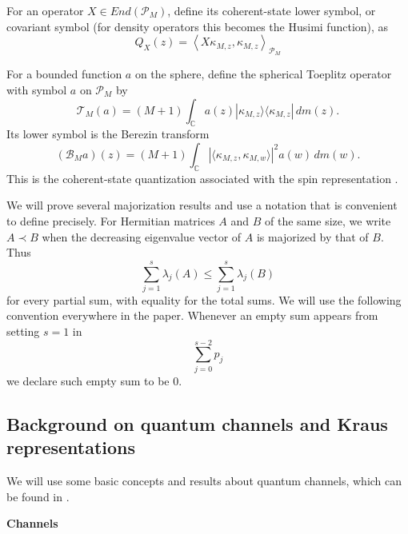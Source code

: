 \documentclass[12pt]{amsart}
\theoremstyle{plain}
\theoremstyle{definition}
\theoremstyle{remark}
\numberwithin{equation}{section}
\newcommand{\1}{\mathbf 1}
\begin{document}
For an operator $X\in End(\mathcal{P}_{M})$, define its coherent-state lower
symbol, or covariant symbol (for density operators this becomes the Husimi
function), as%
\begin{equation}
Q_{X}(z)=\left\langle X\kappa _{M,z},\kappa _{M,z}\right\rangle _{\mathcal{P}%
_{M}}  \label{lowersymbol}
\end{equation}

For a bounded function $a$ on the sphere, define the spherical Toeplitz
operator with symbol $a$ on $\mathcal{P}_{M}$ by 
\begin{equation}
\mathcal{T}_{M}(a)=(M+1)\int_{\mathbb{C}}a(z)|\kappa _{M,z}\rangle \langle
\kappa _{M,z}|\,dm(z).  \label{eq:toeplitzquant}
\end{equation}%
Its lower symbol is the Berezin transform 
\begin{equation}
(\mathcal{B}_{M}a)(z)=(M+1)\int_{\mathbb{C}}|\langle \kappa _{M,z},\kappa
_{M,w}\rangle |^{2}a(w)\,dm(w).  \label{eq:berezin}
\end{equation}%
This is the coherent-state quantization associated with the spin
representation \cite{Berezin}.

We will prove several majorization results and use a notation that is
convenient to define precisely. For Hermitian matrices $A$ and $B$ of the
same size, we write $A\prec B$ when the decreasing eigenvalue vector of $A$
is majorized by that of $B$. Thus 
\begin{equation*}
\sum_{j=1}^{s}\lambda _{j}(A)\leq \sum_{j=1}^{s}\lambda _{j}(B)
\end{equation*}%
for every partial sum, with equality for the total sums. We will use the
following convention everywhere in the paper. Whenever an empty sum appears
from setting $s=1$ in 
\begin{equation*}
\sum_{j=0}^{s-2}p_{j}
\end{equation*}%
we declare such empty sum to be $0$. 



\subsection{Background on quantum channels and Kraus representations}

We will use some basic concepts and results about quantum channels, which
can be found in \cite{Petz,Trevisan}.\ 

\textbf{Channels}
\end{document}
